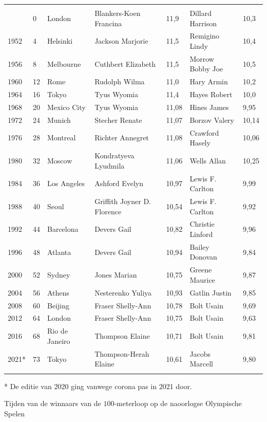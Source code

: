 \begin{tabel}
	\begin{tabular}{C{0.95cm} C{0.9cm} C{2.15cm} C{4.0cm} C{0.85cm} C{3.7cm} C{0.85cm}}
		\hlinethick
		 &  &  &  &  &  &  \\
		 & 0 & London & Blankers-Koen Francina & 11,9 & Dillard Harrison & 10,3 \\
        1952 & 4 & Helsinki & Jackson Marjorie & 11,5 & Remigino Lindy & 10,4 \\
        1956 & 8 & Melbourne & Cuthbert Elizabeth & 11,5 & Morrow Bobby Joe & 10,5 \\
        1960 & 12 & Rome & Rudolph Wilma & 11,0 & Hary Armin & 10,2 \\
        1964 & 16 & Tokyo & Tyus Wyomia & 11,4 & Hayes Robert & 10,0 \\
        1968 & 20 & Mexico City & Tyus Wyomia & 11,08 & Hines James & 9,95 \\
        1972 & 24 & Munich & Stecher Renate & 11,07 & Borzov Valery & 10,14 \\
        1976 & 28 & Montreal & Richter Annegret & 11,08 & Crawford Hasely & 10,06 \\
        1980 & 32 & Moscow & Kondratyeva Lyudmila & 11,06 & Wells Allan & 10,25 \\
        1984 & 36 & Los Angeles & Ashford Evelyn & 10,97 & Lewis F. Carlton & 9,99 \\
        1988 & 40 & Seoul & Griffith Joyner D. Florence & 10,54 & Lewis F. Carlton & 9,92 \\
        1992 & 44 & Barcelona & Devers Gail & 10,82 & Christie Linford & 9,96 \\
        1996 & 48 & Atlanta & Devers Gail & 10,94 & Bailey Donovan & 9,84 \\
        2000 & 52 & Sydney & Jones Marian & 10,75 & Greene Maurice & 9,87 \\
        2004 & 56 & Athens & Nesterenko Yuliya & 10,93 & Gatlin Justin & 9,85 \\
        2008 & 60 & Beijing & Fraser Shelly-Ann & 10,78 & Bolt Usain & 9,69 \\
        2012 & 64 & London & Fraser Shelly-Ann & 10,75 & Bolt Usain & 9,63 \\
        2016 & 68 & Rio de Janeiro & Thompson Elaine & 10,71 & Bolt Usain & 9,81 \\
        2021* & 73 & Tokyo & Thompson-Herah Elaine & 10,61 & Jacobs Marcell & 9,80 \\
		\hlinethick
		\end{tabular}
		* De editie van 2020 ging vanwege corona pas in 2021 door.
	\caption{Tijden van de winnaars van de $100$-meterloop op de naoorlogse Olympische Spelen} \label{tab:OS}
\end{tabel}

